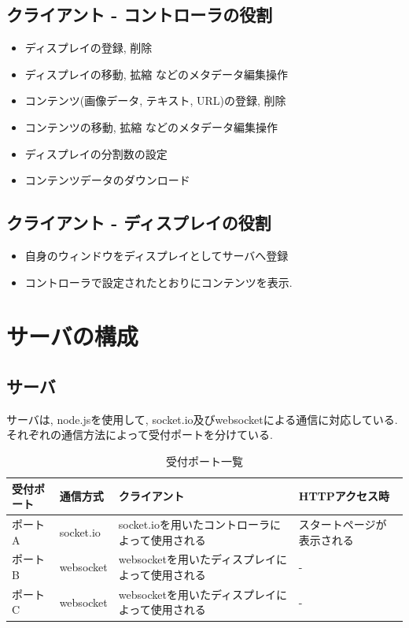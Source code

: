 \documentclass[a4paper,10pt,oneside]{jsbook}
\begin{document}
\subsection{クライアント - コントローラの役割}
\begin{itemize}
\item ディスプレイの登録, 削除
\item ディスプレイの移動, 拡縮 などのメタデータ編集操作
\item コンテンツ(画像データ, テキスト, URL)の登録, 削除
\item コンテンツの移動, 拡縮 などのメタデータ編集操作
\item ディスプレイの分割数の設定
\item コンテンツデータのダウンロード
\end{itemize}

\subsection{クライアント - ディスプレイの役割}
\begin{itemize}
\item 自身のウィンドウをディスプレイとしてサーバへ登録
\item コントローラで設定されたとおりにコンテンツを表示.
\end{itemize}

\section{サーバの構成}

\subsection{サーバ}
サーバは, node.jsを使用して, socket.io及びwebsocketによる通信に対応している. それぞれの通信方法によって受付ポートを分けている. 

\begin{table}[htbp]
\begin{center}
\caption{受付ポート一覧}
\label{ports}
\begin{tabular}{|l|l|l|l|}
\hline
受付ポート & 通信方式 & クライアント & HTTPアクセス時 \\
\hline
\hline
ポートA & socket.io & socket.ioを用いたコントローラによって使用される & スタートページが表示される \\
\hline
ポートB & websocket & websocketを用いたディスプレイによって使用される & - \\
\hline
ポートC & websocket & websocketを用いたディスプレイによって使用される & - \\
\hline

\end{tabular}
\end{center}
\end{table}
\end{document}
